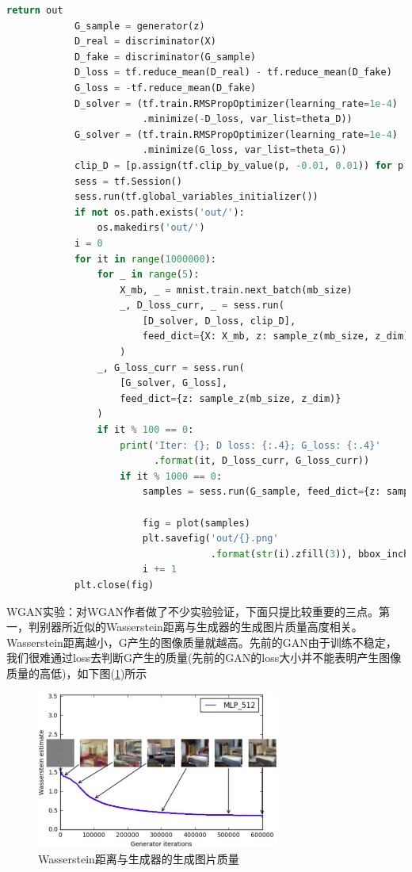 \begin{lstlisting}[language = Python]
                return out
            G_sample = generator(z)
            D_real = discriminator(X)
            D_fake = discriminator(G_sample)
            D_loss = tf.reduce_mean(D_real) - tf.reduce_mean(D_fake)
            G_loss = -tf.reduce_mean(D_fake)
            D_solver = (tf.train.RMSPropOptimizer(learning_rate=1e-4)
                        .minimize(-D_loss, var_list=theta_D))
            G_solver = (tf.train.RMSPropOptimizer(learning_rate=1e-4)
                        .minimize(G_loss, var_list=theta_G))
            clip_D = [p.assign(tf.clip_by_value(p, -0.01, 0.01)) for p in theta_D]
            sess = tf.Session()
            sess.run(tf.global_variables_initializer())
            if not os.path.exists('out/'):
                os.makedirs('out/')
            i = 0
            for it in range(1000000):
                for _ in range(5):
                    X_mb, _ = mnist.train.next_batch(mb_size)
                    _, D_loss_curr, _ = sess.run(
                        [D_solver, D_loss, clip_D],
                        feed_dict={X: X_mb, z: sample_z(mb_size, z_dim)}
                    )
                _, G_loss_curr = sess.run(
                    [G_solver, G_loss],
                    feed_dict={z: sample_z(mb_size, z_dim)}
                )
                if it % 100 == 0:
                    print('Iter: {}; D loss: {:.4}; G_loss: {:.4}'
                          .format(it, D_loss_curr, G_loss_curr))
                    if it % 1000 == 0:
                        samples = sess.run(G_sample, feed_dict={z: sample_z(16, z_dim)})

                        fig = plot(samples)
                        plt.savefig('out/{}.png'
                                    .format(str(i).zfill(3)), bbox_inches='tight')
                        i += 1
            plt.close(fig)
            \end{lstlisting}
            \par
            WGAN实验：对WGAN作者做了不少实验验证，下面只提比较重要的三点。第一，判别器所近似的Wasserstein距离与生成器的生成图片质量高度相关。Wasserstein距离越小，G产生的图像质量就越高。先前的GAN由于训练不稳定，我们很难通过loss去判断G产生的质量(先前的GAN的loss大小并不能表明产生图像质量的高低)，如下图(\ref{fig:Wasserstein距离与生成器的生成图片质量})所示
                \begin{figure}[H]
                \centering
                \includegraphics[width=8cm]{images/Wasserstein_picture.jpg}
                \caption{Wasserstein距离与生成器的生成图片质量}
                \label{fig:Wasserstein距离与生成器的生成图片质量}
                \end{figure}
